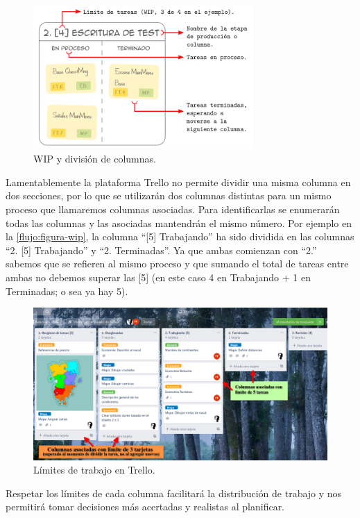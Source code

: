\begin{figure}[H]
	\centering
	\caption{WIP y división de columnas.}
	\label{flujo:figura-col}
	\includegraphics[width=0.75\textwidth]{images/tablero_col.png}
\end{figure}

Lamentablemente la plataforma Trello no permite dividir una misma columna en dos secciones, por lo que se utilizarán dos columnas distintas para un mismo proceso que llamaremos columnas asociadas. Para identificarlas se enumerarán todas las columnas y las asociadas mantendrán el mismo número. Por ejemplo en la \autoref{flujo:figura-wip}, la columna “[5] Trabajando” ha sido dividida en las columnas “2. [5] Trabajando” y “2. Terminadas”. Ya que ambas comienzan con “2.” sabemos que se refieren al mismo proceso y que sumando el total de tareas entre ambas no debemos superar las [5] (en este caso 4 en Trabajando + 1 en Terminadas; o sea ya hay 5).

\begin{figure}[h]
	\centering
	\caption{Límites de trabajo en Trello.}
	\label{flujo:figura-wip}
	\includegraphics[width=\textwidth]{images/tablero02.png}
\end{figure}

Respetar los límites de cada columna facilitará la distribución de trabajo y nos permitirá tomar decisiones más acertadas y realistas al planificar.

